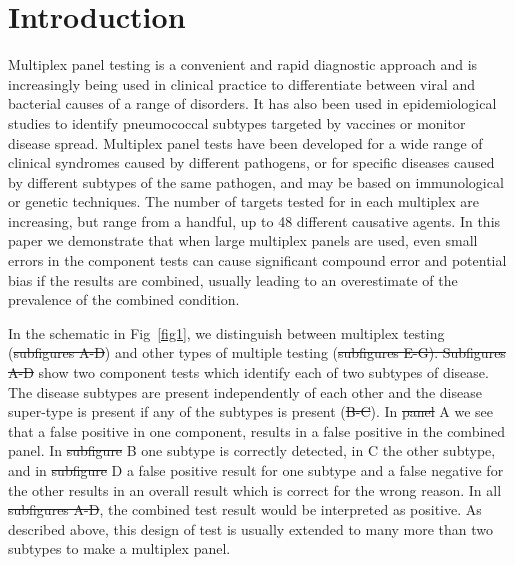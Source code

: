 \documentclass[10pt,letterpaper]{article}
\providecommand{\DIFaddtex}[1]{{\protect\color{blue}\uwave{#1}}} %
\providecommand{\DIFdeltex}[1]{{\protect\color{red}\sout{#1}}}                      %
\providecommand{\DIFaddbegin}{} %
\providecommand{\DIFaddend}{} %
\providecommand{\DIFdelbegin}{} %
\providecommand{\DIFdelend}{} %
\providecommand{\DIFadd}[1]{\texorpdfstring{\DIFaddtex{#1}}{#1}} %
\providecommand{\DIFdel}[1]{\texorpdfstring{\DIFdeltex{#1}}{}} %
\newcommand{\DIFscaledelfig}{0.5}
\newlength{\DIFdelgraphicswidth} %
\newlength{\DIFdelgraphicsheight} %
\newcommand{\DIFaddincludegraphics}[2][]{{\color{blue}\fbox{\DIFOincludegraphics[#1]{#2}}}} %
\newcommand{\DIFdelincludegraphics}[2][]{%
\sbox{\DIFdelgraphicsbox}{\DIFOincludegraphics[#1]{#2}}%
\settoboxwidth{\DIFdelgraphicswidth}{\DIFdelgraphicsbox} %
\settoboxtotalheight{\DIFdelgraphicsheight}{\DIFdelgraphicsbox} %
\scalebox{\DIFscaledelfig}{%
\parbox[b]{\DIFdelgraphicswidth}{\usebox{\DIFdelgraphicsbox}\\[-\baselineskip] \rule{\DIFdelgraphicswidth}{0em}}\llap{\resizebox{\DIFdelgraphicswidth}{\DIFdelgraphicsheight}{%
\setlength{\unitlength}{\DIFdelgraphicswidth}%
\begin{picture}(1,1)%
\thicklines\linethickness{2pt} %
{\color[rgb]{1,0,0}\put(0,0){\framebox(1,1){}}}%
{\color[rgb]{1,0,0}\put(0,0){\line( 1,1){1}}}%
{\color[rgb]{1,0,0}\put(0,1){\line(1,-1){1}}}%
\end{picture}%
}\hspace*{3pt}}} %
} %
\DeclareRobustCommand{\DIFaddbegin}{\DIFOaddbegin \let\includegraphics\DIFaddincludegraphics} %
\DeclareRobustCommand{\DIFaddend}{\DIFOaddend \let\includegraphics\DIFOincludegraphics} %
\DeclareRobustCommand{\DIFdelbegin}{\DIFOdelbegin \let\includegraphics\DIFdelincludegraphics} %
\DeclareRobustCommand{\DIFdelend}{\DIFOaddend \let\includegraphics\DIFOincludegraphics} %
\begin{document}
\linenumbers

\section*{Introduction}

Multiplex panel testing is a convenient and rapid diagnostic approach and is increasingly being used in clinical practice to differentiate between viral and bacterial causes of a range of disorders\cite{ramanan2017}. It has also been used in epidemiological studies to identify pneumococcal subtypes targeted by vaccines\cite{bonten2015} or monitor disease spread\cite{henson2023}. Multiplex panel tests have been developed for a wide range of clinical syndromes caused by different pathogens, or for specific diseases caused by different subtypes of the same pathogen\cite{ramanan2017}, and may be based on immunological\cite{pride2012,kalina2020} or genetic techniques\cite{mengelle2013,murphy2020,jaaskelainen2006,jansen2011,grondahl1999,hendolin1997}. The number of targets tested for in each multiplex are increasing, but range from a handful, up to 48 different causative agents\cite{henson2023}. In this paper we demonstrate that when large multiplex panels are used, even small errors in the component tests can cause significant compound error and potential bias if the results are combined, usually leading to an overestimate of the prevalence of the combined condition.

In the schematic in Fig~\ref{fig1}, we distinguish between multiplex testing (\DIFdelbegin \DIFdel{subfigures A-D}\DIFdelend \DIFaddbegin \DIFadd{\ref{fig1}A-\ref{fig1}D}\DIFaddend ) and other types of multiple testing (\DIFdelbegin \DIFdel{subfigures E-G). Subfigures A-D }\DIFdelend \DIFaddbegin \DIFadd{\ref{fig1}E-\ref{fig1}G). Figs~\ref{fig1}A-\ref{fig1}D }\DIFaddend show two component tests which identify each of two subtypes of disease. The disease subtypes are present independently of each other and the disease super-type is present if any of the subtypes is present (\DIFdelbegin \DIFdel{B-C}\DIFdelend \DIFaddbegin \DIFadd{Fig~\ref{fig1}B-\ref{fig1}C}\DIFaddend ). In \DIFdelbegin \DIFdel{panel }\DIFdelend \DIFaddbegin \DIFadd{Fig~\ref{fig1}}\DIFaddend A we see that a false positive in one component, results in a false positive in the combined panel. In \DIFdelbegin \DIFdel{subfigure }\DIFdelend \DIFaddbegin \DIFadd{Fig~\ref{fig1}}\DIFaddend B one subtype is correctly detected, in \DIFaddbegin \DIFadd{Fig~\ref{fig1}}\DIFaddend C the other subtype, and in \DIFdelbegin \DIFdel{subfigure }\DIFdelend \DIFaddbegin \DIFadd{Fig~\ref{fig1}}\DIFaddend D a false positive result for one subtype and a false negative for the other results in an overall result which is correct for the wrong reason. In all \DIFdelbegin \DIFdel{subfigures A-D}\DIFdelend \DIFaddbegin \DIFadd{Figs~\ref{fig1}A-\ref{fig1}D}\DIFaddend , the combined test result would be interpreted as positive. As described above, this design of test is usually extended to many more than two subtypes to make a multiplex panel.
\end{document}
